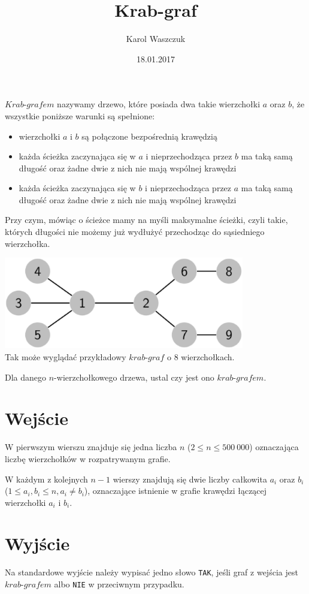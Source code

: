 \documentclass[zad,zawodnik,utf8]{sinol}
\title{Krab-graf}
\author{Karol Waszczuk} %
\date{18.01.2017}
\begin{document}
\begin{tasktext}%

$Krab$-$grafem$ nazywamy drzewo, które posiada dwa takie wierzchołki $a$ oraz $b$, że wszystkie poniższe warunki są spełnione:

\begin{itemize}
\item wierzchołki $a$ i $b$ są połączone bezpośrednią krawędzią
\item każda ścieżka zaczynająca się w $a$ i nieprzechodząca przez $b$ ma taką samą długość oraz żadne dwie z nich nie mają wspólnej krawędzi
\item każda ścieżka zaczynająca się w $b$ i nieprzechodząca przez $a$ ma taką samą długość oraz żadne dwie z nich nie mają wspólnej krawędzi
\end{itemize}

Przy czym, mówiąc o ścieżce mamy na myśli maksymalne ścieżki, czyli takie, których długości nie możemy już wydłużyć przechodząc do sąsiedniego wierzchołka.

\begin{center}
\includegraphics[height=4cm]{krab.eps}\\
\small{Tak może wyglądać przykładowy $krab$-$graf$ o $8$ wierzchołkach.}
\end{center}

Dla danego $n$-wierzchołkowego drzewa, ustal czy jest ono $krab$-$grafem$.

  \section{Wejście}

W pierwszym wierszu znajduje się jedna liczba $n$ ($2 \leq n \leq 500\ 000$) oznaczająca liczbę wierzchołków w rozpatrywanym grafie.

W każdym z kolejnych $n - 1$ wierszy znajdują się dwie liczby całkowita $a_i$ oraz $b_i$ ($1 \leq a_i, b_i \leq n, a_i \neq b_i$), oznaczające istnienie w grafie krawędzi łączącej wierzchołki $a_i$ i $b_i$. 

  \section{Wyjście}
Na standardowe wyjście należy wypisać jedno słowo \texttt{TAK}, jeśli graf z wejścia jest $krab$-$grafem$ albo \texttt{NIE} w przeciwnym przypadku.



\end{tasktext}
\end{document}
